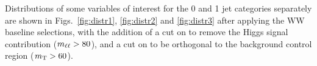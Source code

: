 Distributions of some variables of interest for the 0 and 1 jet categories separately are shown in Figs.~\ref{fig:distr1}, \ref{fig:distr2} and \ref{fig:distr3} after applying the WW baseline selections, with the addition of a cut on \mll to remove the Higgs signal contribution ($m_{\ell\ell} > 80$\GeV), and a cut on \mt to be orthogonal to the \dytt background control region ($m_\mathrm{T} > 60$\GeV).

\begin{figure}
\centering
{}
\\
\end{figure}
